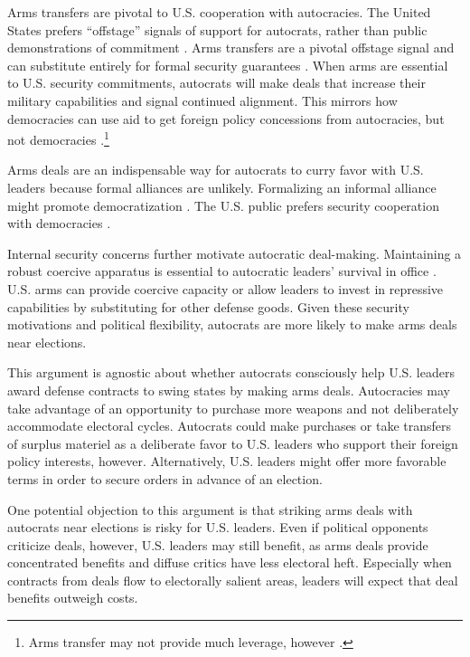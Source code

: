 \documentclass[12pt]{article}
\begin{document}
Arms transfers are pivotal to U.S. cooperation with autocracies.  
The United States prefers ``offstage'' signals of support for autocrats, rather than public demonstrations of commitment \citep{McManusYarhi-Milo2017}.
Arms transfers are a pivotal offstage signal and can substitute entirely for formal security guarantees \citep{Yarhi-Miloetal2016}. 
When arms are essential to U.S. security commitments, autocrats will make deals that increase their military capabilities and signal continued alignment.
This mirrors how democracies can use aid to get foreign policy concessions from autocracies, but not democracies \citep{BDMSmith2009}.\footnote{Arms transfer may not provide much leverage, however \citep{Spindel2023}.}


Arms deals are an indispensable way for autocrats to curry favor with U.S. leaders because formal alliances are unlikely.  
Formalizing an informal alliance might promote democratization \citep{GiblerWolford2006}.
The U.S. public prefers security cooperation with democracies \citep{Alley2023}. 


Internal security concerns further motivate autocratic deal-making. 
Maintaining a robust coercive apparatus is essential to autocratic leaders' survival in office \citep{Boix2008}. 
U.S. arms can provide coercive capacity or allow leaders to invest in repressive capabilities by substituting for other defense goods. 
Given these security motivations and political flexibility, autocrats are more likely to make arms deals near elections.


This argument is agnostic about whether autocrats consciously help U.S. leaders award defense contracts to swing states by making arms deals.
Autocracies may take advantage of an opportunity to purchase more weapons and not deliberately accommodate electoral cycles. 
Autocrats could make purchases or take transfers of surplus materiel as a deliberate favor to U.S. leaders who support their foreign policy interests, however. 
Alternatively, U.S. leaders might offer more favorable terms in order to secure orders in advance of an election.


One potential objection to this argument is that striking arms deals with autocrats near elections is risky for U.S. leaders. 
Even if political opponents criticize deals, however, U.S. leaders may still benefit, as arms deals provide concentrated benefits and diffuse critics have less electoral heft.
Especially when contracts from deals flow to electorally salient areas, leaders will expect that deal benefits outweigh costs. 
\end{document}
